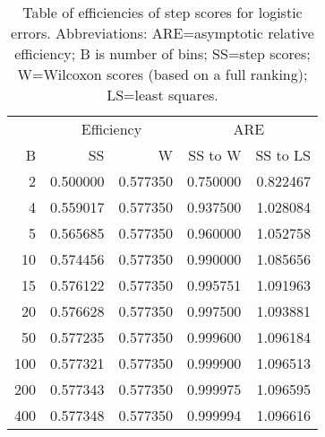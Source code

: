 \begin{table}[ht]
\centering
\begin{tabular}{r|rr|rr}
  \hline
 & \multicolumn{2}{c|}{Efficiency} & \multicolumn{2}{|c}{ARE} \\
B & SS & W & SS to W & SS to LS \\ 
  \hline
 2 & 0.500000 & 0.577350 & 0.750000 & 0.822467 \\ 
 4 & 0.559017 & 0.577350 & 0.937500 & 1.028084 \\ 
 5 & 0.565685 & 0.577350 & 0.960000 & 1.052758 \\ 
 10 & 0.574456 & 0.577350 & 0.990000 & 1.085656 \\ 
 15 & 0.576122 & 0.577350 & 0.995751 & 1.091963 \\ 
 20 & 0.576628 & 0.577350 & 0.997500 & 1.093881 \\ 
 50 & 0.577235 & 0.577350 & 0.999600 & 1.096184 \\ 
 100 & 0.577321 & 0.577350 & 0.999900 & 1.096513 \\ 
 200 & 0.577343 & 0.577350 & 0.999975 & 1.096595 \\ 
 400 & 0.577348 & 0.577350 & 0.999994 & 1.096616 \\ 
   \hline
\end{tabular}
\caption{
Table of efficiencies of step scores for logistic errors.
Abbreviations: ARE=asymptotic relative efficiency; B is number of bins; SS=step scores; W=Wilcoxon scores (based on a full ranking); LS=least squares.
}
\label{tabefflog}
\end{table}

